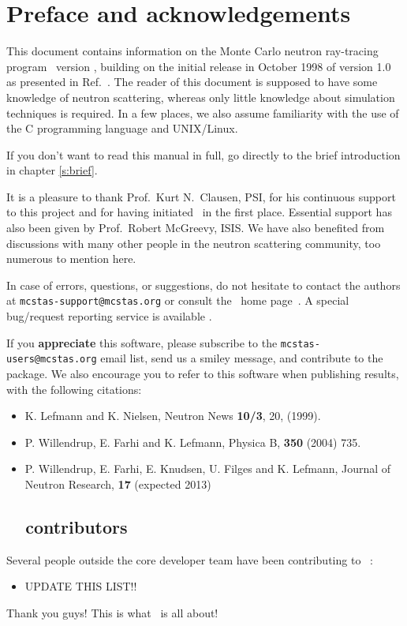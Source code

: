 
\chapter*{Preface and acknowledgements}
This document contains information on the Monte Carlo neutron
ray-tracing program \MCS\ version \version, building on the initial
release in October 1998 of version 1.0 as presented in Ref.~\cite{nn_10_20}. The reader of this
document is supposed to have some knowledge of neutron scattering,
whereas only little knowledge about simulation techniques is
required. In a few places, we also assume familiarity with the
use of the C programming language and UNIX/Linux.

If you don't want to read this manual in full, go directly to the brief introduction in chapter \ref{s:brief}.

It is a pleasure to thank Prof.~Kurt N.~Clausen, PSI, for his continuous
support to this project and for having initiated \MCS\ in the first
place. Essential support has also been given by Prof.~Robert McGreevy, ISIS.
We have also benefited from discussions with many other people in the neutron scattering
community, too numerous to mention here.

In case of errors, questions, or suggestions, do not hesitate to
contact the authors at \verb+mcstas-support@mcstas.org+
or consult the \MCS\ home page~\cite{mcstas_webpage}.
A special bug/request reporting service is available \cite{mczilla_webpage}.

If you {\bf appreciate} this software, please subscribe to the \verb+mcstas-users@mcstas.org+ email list, send us a smiley message, and contribute to the package. We also encourage you to refer to this software when publishing results, with the following citations:
\begin{itemize}
\item{K. Lefmann and K. Nielsen, Neutron News {\bf 10/3}, 20, (1999).}
\item{P. Willendrup, E. Farhi and K. Lefmann, Physica B, {\bf 350} (2004) 735.}
\item{P. Willendrup, E. Farhi, E. Knudsen, U. Filges and K. Lefmann,
    Journal of Neutron Research, {\bf 17} (expected 2013)}
\end{itemize}


\section*{\MCS\ \version\ contributors}
Several people outside the core developer team have been contributing
to \MCS\ \version:
\begin{itemize}
\item UPDATE THIS LIST!!
\end{itemize}
Thank you guys! This is what \MCS\ is all about!

